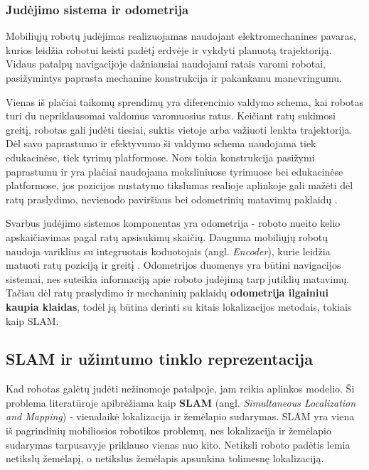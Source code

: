 \documentclass[]{VUMIFTemplateClass}
\begin{document}
\subsubsection{Judėjimo sistema ir odometrija}

Mobiliųjų robotų judėjimas realizuojamas naudojant elektromechanines pavaras, kurios leidžia robotui keisti padėtį erdvėje ir vykdyti planuotą trajektoriją. Vidaus patalpų navigacijoje dažniausiai naudojami ratais varomi robotai, pasižymintys paprasta mechanine konstrukcija ir pakankamu manevringumu.

Vienas iš plačiai taikomų sprendimų yra diferencinio valdymo schema, kai robotas turi du nepriklausomai valdomus varomuosius ratus. Keičiant ratų sukimosi greitį, robotas gali judėti tiesiai, suktis vietoje arba važiuoti lenkta trajektorija. Dėl savo paprastumo ir efektyvumo ši valdymo schema naudojama tiek edukacinėse, tiek tyrimų platformose. Nors tokia konstrukcija pasižymi paprastumu ir yra plačiai naudojama moksliniuose tyrimuose bei edukacinėse platformose, jos pozicijos nustatymo tikslumas realioje aplinkoje gali mažėti dėl ratų praslydimo, nevienodo paviršiaus bei odometrinių matavimų paklaidų \cite{odometry-drift}.

Svarbus judėjimo sistemos komponentas yra odometrija - roboto nueito kelio apskaičiavimas pagal ratų apsisukimų skaičių. Dauguma mobiliųjų robotų naudoja variklius su integruotais koduotojais (angl. \textit{Encoder}), kurie leidžia matuoti ratų poziciją ir greitį \cite{Dynamixel-motor-puslapis}. Odometrijos duomenys yra būtini navigacijos sistemai, nes suteikia informaciją apie roboto judėjimą tarp jutiklių matavimų. Tačiau dėl ratų praslydimo ir mechaninių paklaidų \textbf{odometrija ilgainiui kaupia klaidas}, todėl ją būtina derinti su kitais lokalizacijos metodais, tokiais kaip SLAM.


\subsection{SLAM ir užimtumo tinklo reprezentacija}

Kad robotas galėtų judėti nežinomoje patalpoje, jam reikia aplinkos modelio. Ši problema literatūroje apibrėžiama kaip \textbf{SLAM} (angl. \textit{Simultaneous
Localization and Mapping}) - vienalaikė lokalizacija ir žemėlapio sudarymas. SLAM yra viena iš pagrindinių mobiliosios robotikos problemų, nes lokalizacija ir
žemėlapio sudarymas tarpusavyje priklauso vienas nuo kito. Netiksli roboto padėtis lemia netikslų žemėlapį, o netikslus žemėlapis apsunkina tolimesnę
lokalizaciją.
\end{document}
